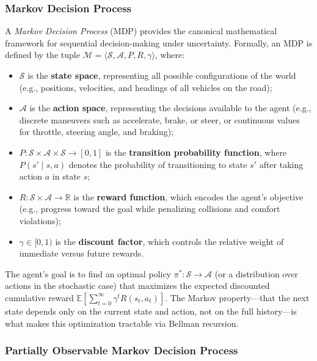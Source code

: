 \documentclass[12pt, a4paper]{article}
\begin{document}
\subsubsection*{Markov Decision Process}

A \emph{Markov Decision Process} (MDP) provides the canonical mathematical
framework for sequential decision-making under uncertainty.  Formally, an MDP
is defined by the tuple
$\mathcal{M} = \langle \mathcal{S}, \mathcal{A}, P, R, \gamma \rangle$,
where:
\begin{itemize}[noitemsep]
  \item $\mathcal{S}$ is the \textbf{state space}, representing all possible
        configurations of the world (e.g., positions, velocities, and headings
        of all vehicles on the road);
  \item $\mathcal{A}$ is the \textbf{action space}, representing the decisions
        available to the agent (e.g., discrete maneuvers such as accelerate,
        brake, or steer, or continuous values for throttle, steering angle, and
        braking);
  \item $P: \mathcal{S} \times \mathcal{A} \times \mathcal{S} \to [0,1]$ is the
        \textbf{transition probability function}, where $P(s' \mid s, a)$ denotes
        the probability of transitioning to state $s'$ after taking action $a$ in
        state $s$;
  \item $R: \mathcal{S} \times \mathcal{A} \to \mathbb{R}$ is the \textbf{reward
        function}, which encodes the agent's objective (e.g., progress toward the
        goal while penalizing collisions and comfort violations);
  \item $\gamma \in [0, 1)$ is the \textbf{discount factor}, which controls the
        relative weight of immediate versus future rewards.
\end{itemize}
The agent's goal is to find an optimal policy $\pi^*: \mathcal{S} \to \mathcal{A}$
(or a distribution over actions in the stochastic case) that maximizes the
expected discounted cumulative reward
$\mathbb{E}\!\left[\sum_{t=0}^{\infty} \gamma^t R(s_t, a_t)\right]$.
The Markov property---that the next state depends only on the current state and
action, not on the full history---is what makes this optimization tractable via
Bellman recursion.

\subsubsection*{Partially Observable Markov Decision Process}
\end{document}
